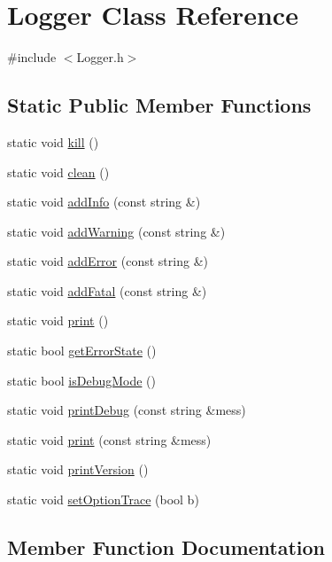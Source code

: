 \hypertarget{classLogger}{}\section{Logger Class Reference}
\label{classLogger}


{\ttfamily \#include $<$Logger.\+h$>$}

\subsection*{Static Public Member Functions}
\begin{DoxyCompactItemize}
\item 
static void \hyperlink{classLogger_a7d12d63e39ef239d8618c70f320af9f5}{kill} ()
\item 
static void \hyperlink{classLogger_ad77508d101213f207cc5a0718591674c}{clean} ()
\item 
static void \hyperlink{classLogger_a120908976176ae4ccbca24637014b210}{add\+Info} (const string \&)
\item 
static void \hyperlink{classLogger_a3f763ca60b87026d16e0df8b84b61ffd}{add\+Warning} (const string \&)
\item 
static void \hyperlink{classLogger_ad90a25737a4550c0f98cd59a3f9ede71}{add\+Error} (const string \&)
\item 
static void \hyperlink{classLogger_a45bc045e4a10a572eb678ff4790f7406}{add\+Fatal} (const string \&)
\item 
static void \hyperlink{classLogger_a563a895bb1f8087848356d6ddf66e215}{print} ()
\item 
static bool \hyperlink{classLogger_a958e10841789b9deaf94b45a1aca119b}{get\+Error\+State} ()
\item 
static bool \hyperlink{classLogger_af58915accf265cdfe2d2c747c5b58c4e}{is\+Debug\+Mode} ()
\item 
static void \hyperlink{classLogger_a08aae7defa6b2371c54bee304969a3a2}{print\+Debug} (const string \&mess)
\item 
static void \hyperlink{classLogger_ad758e3048abf6472bec574e3513360e3}{print} (const string \&mess)
\item 
static void \hyperlink{classLogger_a17007e8d94f05800f1d5f88687ccc9a8}{print\+Version} ()
\item 
static void \hyperlink{classLogger_ae03bdbeb7700b531df4cd67abec9ed0d}{set\+Option\+Trace} (bool b)
\end{DoxyCompactItemize}


\subsection{Member Function Documentation}
\mbox{\label{classLogger_ad90a25737a4550c0f98cd59a3f9ede71}} 
